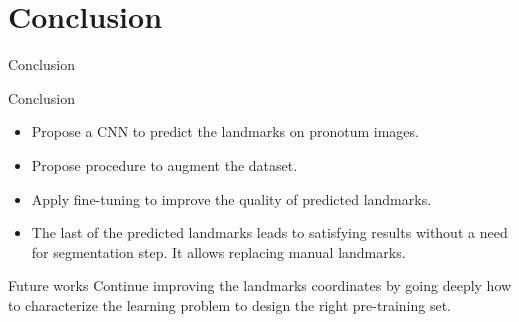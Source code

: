 \documentclass[10pt]{beamer}
\begin{document}
\section{Conclusion}
\begin{frame}{Conclusion}
	\begin{block}{Conclusion}
		\small{
			\begin{itemize}
				\item Propose a CNN to predict the landmarks on pronotum images.
				\item Propose procedure to augment the dataset.
				\item Apply fine-tuning to improve the quality of predicted landmarks.
				\item The last of the predicted landmarks leads to satisfying results without a need for segmentation step. It allows replacing manual landmarks.
			\end{itemize}
		}
	\end{block}
	\pause
	\begin{block}{Future works}
		\small{Continue improving the landmarks coordinates by going deeply how to characterize the learning problem to design the right pre-training set.}
	\end{block}
\end{frame}

{\1
\begin{frame}
\end{frame}}
\end{document}
